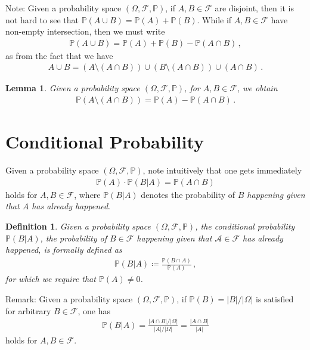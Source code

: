 \documentclass[11pt, onesided]{book}
\theoremstyle{break}
\theoremstyle{break}
\newtheorem{lem}{Lemma}[thm]
\newtheorem{defn}{Definition}[thm]
\newcommand{\note}{\color{red}Note: \color{black}}
\newcommand{\remark}{\color{blue}Remark: \color{black}}
\begin{document}
\note Given a probability space $(\Omega, \mathcal{F}, \mathbb{P})$, if $A, B \in \mathcal{F}$ are disjoint, then it is not hard to see that $\mathbb{P}(A\cup B ) = \mathbb{P}(A) + \mathbb{P}(B)$. While if $A, B \in \mathcal{F}$ have non-empty intersection, then we must write
\begin{align*}
\mathbb{P}(A\cup B) = \mathbb{P}(A) + \mathbb{P}(B) - \mathbb{P}(A\cap B)\,,
\end{align*}
as from the fact that we have
\begin{align*}
A \cup B = (A\setminus (A\cap B))\cup (B\setminus (A\cap B)) \cup (A\cap B)\,.
\end{align*}

\begin{lem}
Given a probability space $(\Omega, \mathcal{F}, \mathbb{P})$, for $A , B \in \mathcal{F}$, we obtain 
\begin{align*}
\mathbb{P}(A \setminus (A\cap B)) = \mathbb{P}(A) - \mathbb{P}(A\cap B)
\,.
\end{align*}
\end{lem}

\section[Conditional Probability]{\color{red} Conditional Probability \color{black}}
Given a probability space $(\Omega, \mathcal{F}, \mathbb{P})$, note intuitively that one gets immediately 
\begin{align*}
\mathbb{P}(A) \cdot \mathbb{P}(B|A) = \mathbb{P}(A\cap B)
\end{align*}
holds for $A,B \in \mathcal{F}$, where $\mathbb{P}(B|A)$ denotes the probability of\textit{ $B$ happening given that $A$ has already happened}.
\begin{defn}
Given a probability space $(\Omega, \mathcal{F}, \mathbb{P})$, the conditional probability $\mathbb{P}(B|A)$, the probability of $B\in \mathcal{F}$ happening given that $\mathcal{A}\in \mathcal{F}$ has already happened, is formally defined as
\begin{align*}
\mathbb{P}(B|A)\coloneqq \frac{\mathbb{P}(B\cap A)}{\mathbb{P}(A)}\,,
\end{align*}
for which we require that $\mathbb{P}(A) \neq 0$. 
\end{defn}
\remark Given a probability space $(\Omega, \mathcal{F}, \mathbb{P})$, if $\mathbb{P}(B) = |B|/|\Omega|$ is satisfied for arbitrary $B \in \mathcal{F}$, one has
\begin{align*}
\mathbb{P}(B|A) = \frac{|A\cap B|/|\Omega|}{|A|/|\Omega|} = \frac{|A\cap B|}{|A|}
\end{align*} 
holds for $A,B \in \mathcal{F}$. 
\end{document}
